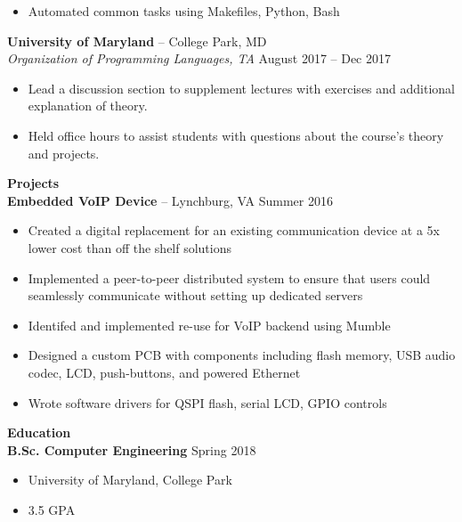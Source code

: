 \documentclass[10pt]{article}
\begin{document}
\begin{textblock}{0.7}
\begin{itemize}
        \item Automated common tasks using Makefiles, Python, Bash
      \end{itemize}
      \textbf{University of Maryland} -- College Park, MD \\
      \textit{Organization of Programming Languages, TA} \hfill August 2017 -- Dec 2017
      \begin{itemize}
        \setlength{\itemsep}{0pt}
        \item Lead a discussion section to supplement lectures with exercises and additional explanation of theory.
        \item Held office hours to assist students with questions about the course's theory and projects.
      \end{itemize}
    \textbf{\large Projects} \\
      \textbf{Embedded VoIP Device} -- Lynchburg, VA \hfill Summer 2016
      \begin{itemize}
        \setlength{\itemsep}{0pt}
        \item Created a digital replacement for an existing communication device at a 5x lower cost than off the shelf solutions
        \item Implemented a peer-to-peer distributed system to ensure that users could seamlessly communicate without setting up dedicated servers
        \item Identifed and implemented re-use for VoIP backend using Mumble
        \item Designed a custom PCB with components including flash memory, USB audio codec, LCD, push-buttons, and powered Ethernet
        \item Wrote software drivers for QSPI flash, serial LCD, GPIO controls
      \end{itemize}
    \textbf{\large Education } \\
      \textbf{B.Sc. Computer Engineering} \hfill Spring 2018
      \begin{itemize}
        \setlength{\itemsep}{0pt}
        \item University of Maryland, College Park
        \item 3.5 GPA
      \end{itemize}
  \end{textblock}
\end{document}
